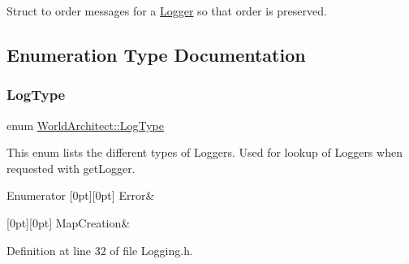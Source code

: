 Struct to order messages for a \mbox{\hyperlink{class_world_architect_1_1_logger}{Logger}} so that order is preserved. 



\subsection{Enumeration Type Documentation}
\mbox{\label{namespace_world_architect_adf13e54f2c38346ed9d5013cff07fc8e}} 
\subsubsection{\texorpdfstring{LogType}{LogType}}
{\footnotesize\ttfamily enum \mbox{\hyperlink{namespace_world_architect_adf13e54f2c38346ed9d5013cff07fc8e}{World\+Architect\+::\+Log\+Type}}}



This enum lists the different types of Loggers. Used for lookup of Loggers when requested with get\+Logger. 

\begin{DoxyEnumFields}{Enumerator}
[0pt][0pt]{}\mbox{\label{namespace_world_architect_adf13e54f2c38346ed9d5013cff07fc8ea44dfaf0aee28e2619e6bff75a7d60ba2}} 
Error&\\
\hline

[0pt][0pt]{}\mbox{\label{namespace_world_architect_adf13e54f2c38346ed9d5013cff07fc8ea7af42ff20928d5e5e2650a97d7e277d0}} 
Map\+Creation&\\
\hline

\end{DoxyEnumFields}


Definition at line 32 of file Logging.\+h.

\mbox{\label{namespace_world_architect_a9bb4333e2d555bf42bf7d14ec2a2ae7b}} 
